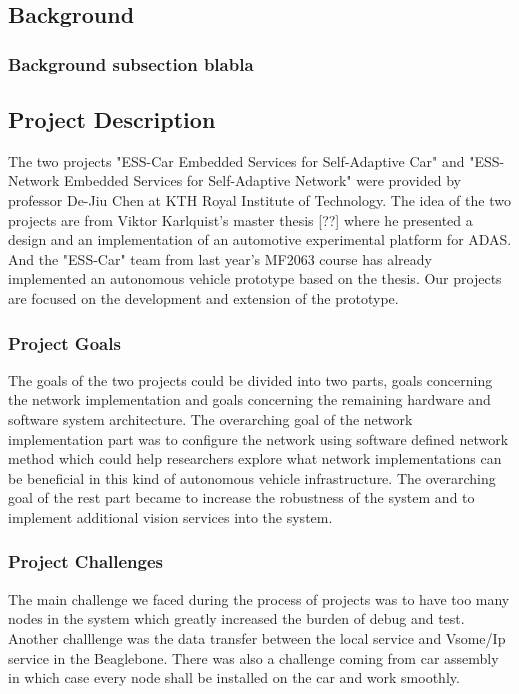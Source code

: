 \documentclass[11pt, titlepage]{article} %
\begin{document}
\subsection{Background}

\subsubsection{Background subsection blabla}

\subsection{Project Description}
The two projects "ESS-Car Embedded Services for Self-Adaptive Car" and "ESS-Network Embedded Services for Self-Adaptive Network" were provided by professor De-Jiu Chen at KTH Royal Institute of Technology. The idea of the two projects are from Viktor Karlquist's master thesis [??] where he presented a design and an implementation of an automotive experimental platform for ADAS. And the "ESS-Car" team from last year's MF2063 course has already implemented an autonomous vehicle prototype based on the thesis. Our projects are focused on the development and extension of the prototype.

\subsubsection{Project Goals}
The goals of the two projects could be divided into two parts, goals concerning the network implementation and goals concerning the remaining hardware and software system architecture.
The overarching goal of the network implementation part was to configure the network using software defined network method which could help researchers explore what network implementations can be beneficial in this kind of autonomous vehicle infrastructure. The overarching goal of the rest part became to increase the robustness of the system and to implement additional vision services into the system.

\subsubsection{Project Challenges}
The main challenge we faced during the process of projects was to have too many nodes in the system which greatly increased the burden of debug and test. Another challlenge was the data transfer between the local service and Vsome/Ip service in the Beaglebone. There was also a challenge coming from car assembly in which case every node shall be installed on the car and work smoothly. 
\end{document}
